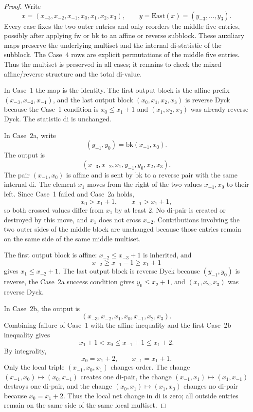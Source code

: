 \documentclass[11pt]{article}
\theoremstyle{plain}
\theoremstyle{definition}
\theoremstyle{remark}
\newcommand{\di}{\mathrm{di}}
\begin{document}
\begin{proof}
Write
\[
  x=(x_{-3},x_{-2},x_{-1},x_0,x_1,x_2,x_3),
  \qquad
  y=\mathrm{East}(x)=(y_{-3},\ldots,y_3).
\]
Every case fixes the two outer entries and only reorders the middle five
entries, possibly after applying \(\mathrm{fw}\) or \(\mathrm{bk}\) to an
affine or reverse subblock. These auxiliary maps preserve the underlying
multiset and the internal \(\di\)-statistic of the subblock. The Case~4 rows
are explicit permutations of the middle five entries. Thus the multiset is
preserved in all cases; it remains to check the mixed affine/reverse structure
and the total \(\di\)-value.

In Case~1 the map is the identity. The first output block is the affine prefix
\((x_{-3},x_{-2},x_{-1})\), and the last output block
\((x_0,x_1,x_2,x_3)\) is reverse Dyck because the Case~1 condition is
\(x_0\le x_1+1\) and \((x_1,x_2,x_3)\) was already reverse Dyck. The statistic
\(\di\) is unchanged.

In Case~2a, write
\[
  (y_{-1},y_0)=\mathrm{bk}(x_{-1},x_0).
\]
The output is
\[
  (x_{-3},x_{-2},x_1,y_{-1},y_0,x_2,x_3).
\]
The pair \((x_{-1},x_0)\) is affine and is sent by \(\mathrm{bk}\) to a
reverse pair with the same internal \(\di\). The element \(x_1\) moves from the
right of the two values \(x_{-1},x_0\) to their left. Since Case~1 failed and
Case~2a holds,
\[
  x_0>x_1+1,
  \qquad
  x_{-1}>x_1+1,
\]
so both crossed values differ from \(x_1\) by at least \(2\). No \(\di\)-pair
is created or destroyed by this move, and \(x_1\) does not cross
\(x_{-2}\). Contributions involving the two outer sides of the middle block are
unchanged because those entries remain on the same side of the same middle
multiset.

The first output block is affine: \(x_{-2}\le x_{-3}+1\) is inherited, and
\[
  x_{-2}\ge x_{-1}-1\ge x_1+1
\]
gives \(x_1\le x_{-2}+1\). The last output block is reverse Dyck because
\((y_{-1},y_0)\) is reverse, the Case~2a success condition gives
\(y_0\le x_2+1\), and \((x_1,x_2,x_3)\) was reverse Dyck.

In Case~2b, the output is
\[
  (x_{-3},x_{-2},x_1,x_0,x_{-1},x_2,x_3).
\]
Combining failure of Case~1 with the affine inequality and the first Case~2b
inequality gives
\[
  x_1+1<x_0\le x_{-1}+1\le x_1+2.
\]
By integrality,
\[
  x_0=x_1+2,
  \qquad
  x_{-1}=x_1+1.
\]
Only the local triple \((x_{-1},x_0,x_1)\) changes order. The change
\((x_{-1},x_0)\mapsto(x_0,x_{-1})\) creates one \(\di\)-pair, the change
\((x_{-1},x_1)\mapsto(x_1,x_{-1})\) destroys one \(\di\)-pair, and the change
\((x_0,x_1)\mapsto(x_1,x_0)\) changes no \(\di\)-pair because
\(x_0=x_1+2\). Thus the local net change in \(\di\) is zero; all outside
entries remain on the same side of the same local multiset.


\end{proof}
\end{document}

